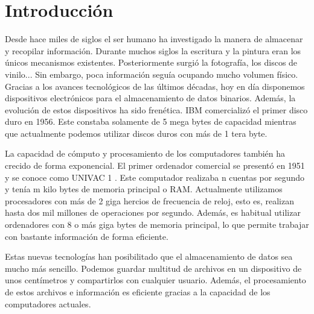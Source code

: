 \documentclass[10pt]{article}
\begin{document}
\maketitle



\newpage
\tableofcontents
\newpage


\section{Introducción}

	Desde hace miles de siglos el ser humano ha investigado la manera de almacenar y recopilar información. Durante muchos siglos la escritura y la pintura eran los únicos mecanismos existentes. Posteriormente surgió la fotografía, los discos de vinilo... Sin embargo, poca información seguía ocupando mucho volumen físico. Gracias a los avances tecnológicos de las últimos décadas, hoy en día disponemos dispositivos electrónicos para el almacenamiento de datos binarios. Además, la evolución de estos dispositivos ha sido frenética. IBM comercializó el primer disco duro en 1956. Este constaba solamente de 5 mega bytes de capacidad \cite{hard-disks} mientras que actualmente podemos utilizar discos duros con más de 1 tera byte.

	La capacidad de cómputo y procesamiento de los computadores también ha crecido de forma exponencial. El primer ordenador comercial se presentó en 1951 y se conoce como  UNIVAC 1 \cite{first-commercial-computer}. Este computador realizaba n cuentas por segundo y tenía m kilo bytes de memoria principal o RAM. Actualmente utilizamos procesadores con más de 2 giga hercios de frecuencia de reloj, esto es, realizan hasta dos mil millones de operaciones por segundo. Además, es habitual utilizar ordenadores con 8 o más giga bytes de memoria principal, lo que permite trabajar con bastante información de forma eficiente. 

	Estas nuevas tecnologías han posibilitado que el almacenamiento de datos sea mucho más sencillo. Podemos guardar multitud de archivos en un dispositivo de unos centímetros y compartirlos con cualquier usuario. Además, el procesamiento de estos archivos e información es eficiente gracias a la capacidad de los computadores actuales. 
	
\end{document}
